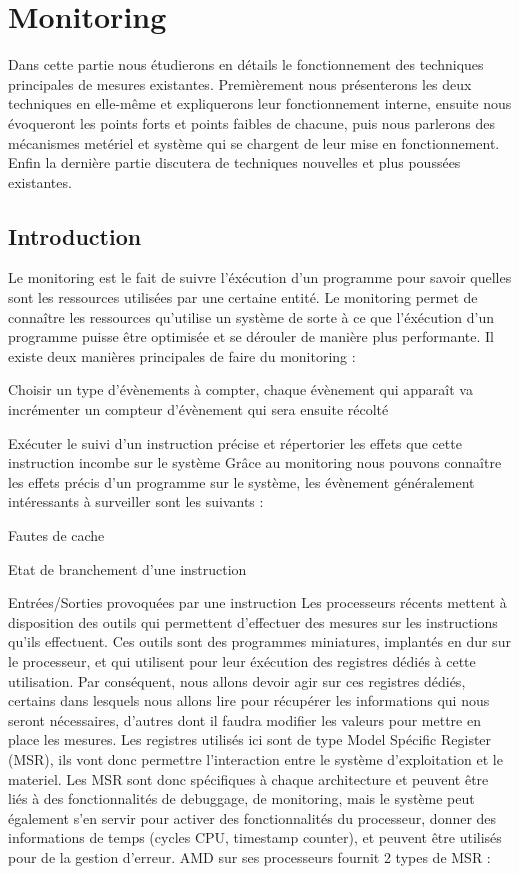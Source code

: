 \chapter{Monitoring}
	Dans cette partie nous étudierons en détails le fonctionnement des techniques principales de mesures existantes. Premièrement nous présenterons les deux techniques en elle-même et expliquerons leur fonctionnement interne, ensuite nous évoqueront les points forts et points faibles de chacune, puis nous parlerons des mécanismes metériel et système qui se chargent de leur mise en fonctionnement. Enfin la dernière partie discutera de techniques nouvelles et plus poussées existantes.
	\section{Introduction}
		Le monitoring est le fait de suivre l'éxécution d'un programme pour savoir quelles sont les ressources utilisées par une certaine entité. Le monitoring permet de connaître les ressources qu'utilise un système de sorte à ce que l'éxécution d'un programme puisse être optimisée et se dérouler de manière plus performante. Il existe deux manières principales de faire du monitoring : 
		\benum
			\item{Choisir un type d'évènements à compter, chaque évènement qui apparaît va incrémenter un compteur d'évènement qui sera ensuite récolté}
			\item{Exécuter le suivi d'un instruction précise et répertorier les effets que cette instruction incombe sur le système}
		\eenum
		Grâce au monitoring nous pouvons connaître les effets précis d'un programme sur le système, les évènement généralement intéressants à surveiller sont les suivants :
		\benum
			\item{Fautes de cache}
			\item{Etat de branchement d'une instruction}
			\item{Entrées/Sorties provoquées par une instruction}
		\eenum
		Les processeurs récents mettent à disposition des outils qui permettent d'effectuer des mesures sur les instructions qu'ils effectuent. Ces outils sont des programmes miniatures, implantés en dur sur le processeur, et qui utilisent pour leur éxécution des registres dédiés à cette utilisation. Par conséquent, nous allons devoir agir sur ces registres dédiés, certains dans lesquels nous allons lire pour récupérer les informations qui nous seront nécessaires, d'autres dont il faudra modifier les valeurs pour mettre en place les mesures. Les registres utilisés ici sont de type Model Spécific Register (MSR), ils vont donc permettre l'interaction entre le système d'exploitation et le materiel. Les MSR sont donc spécifiques à chaque architecture et peuvent être liés à des fonctionnalités de debuggage, de monitoring, mais le système peut également s'en servir pour activer des fonctionnalités du processeur, donner des informations de temps (cycles CPU, timestamp counter), et peuvent être utilisés pour de la gestion d'erreur. AMD sur ses processeurs fournit 2 types de MSR : 
